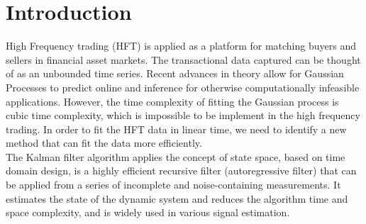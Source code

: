 \documentclass[12pt]{article}
\begin{document}
\begin{titlepage}



 


\vfill %

\end{titlepage}

\setcounter{page}{1}
\tableofcontents
\pagebreak

\setcounter{page}{1}

\section{Introduction}
High Frequency trading (HFT) is applied as a platform for matching buyers and sellers in financial asset markets. The transactional data captured can be thought of as an unbounded time series. Recent advances in theory allow for Gaussian Processes to predict online and inference for otherwise computationally infeasible applications. However, the time complexity of fitting the Gaussian process is cubic time complexity, which is impossible to be implement in the high frequency trading. In order to fit the HFT data in linear time, we need to identify a new method that can fit the data more efficiently. \\

The Kalman filter algorithm applies the concept of state space, based on time domain design, is a highly efficient recursive filter (autoregressive filter) that can be applied from a series of incomplete and noise-containing measurements. It estimates the state of the dynamic system and reduces the algorithm time and space complexity, and is widely used in various signal estimation.\\
\end{document}
